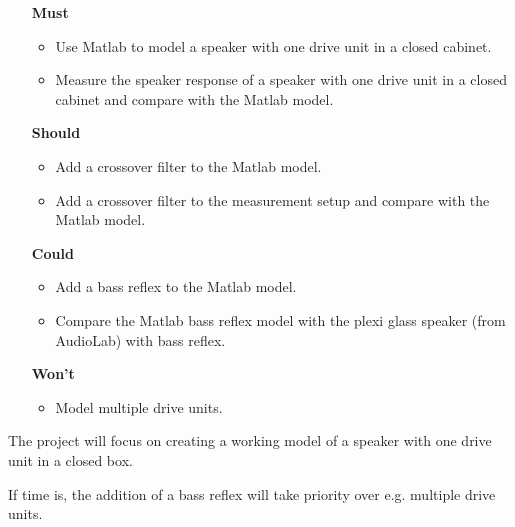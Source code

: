 \begin{itemize}
	\item[\textbf{Must}] 
	\begin{itemize}
		\item Use Matlab to model a speaker with one drive unit in a closed cabinet.
		\item Measure the speaker response of a speaker with one drive unit in a closed cabinet and compare with the Matlab model.
	\end{itemize}
	\item[\textbf{Should}] 
	\begin{itemize}
		\item Add a crossover filter to the Matlab model.
		\item Add a crossover filter to the measurement setup and compare with the Matlab model.
	\end{itemize}
	\item[\textbf{Could}] 
	\begin{itemize}
		\item Add a bass reflex to the Matlab model.
		\item Compare the Matlab bass reflex model with the plexi glass speaker (from AudioLab) with bass reflex.
	\end{itemize}
	\item[\textbf{Won't}] 
	\begin{itemize}
		\item Model multiple drive units.
	\end{itemize}
\end{itemize}

The project will focus on creating a working model of a speaker with one drive unit in a closed box.

If time is, the addition of a bass reflex will take priority over e.g. multiple drive units.
